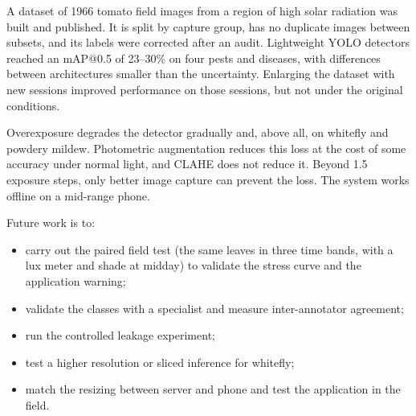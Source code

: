 \documentclass[sensors,article,submit,pdftex,moreauthors]{Definitions/mdpi}
\begin{document}
A dataset of 1966 tomato field images from a region of high solar radiation was built and published. It is split by capture group, has no duplicate images between subsets, and its labels were corrected after an audit. Lightweight YOLO detectors reached an mAP@0.5 of 23--30\% on four pests and diseases, with differences between architectures smaller than the uncertainty. Enlarging the dataset with new sessions improved performance on those sessions, but not under the original conditions.

Overexposure degrades the detector gradually and, above all, on whitefly and powdery mildew. Photometric augmentation reduces this loss at the cost of some accuracy under normal light, and CLAHE does not reduce it. Beyond 1.5 exposure steps, only better image capture can prevent the loss. The system works offline on a mid-range phone.

Future work is to:
\begin{itemize}[leftmargin=*,labelsep=4.9mm]
\item carry out the paired field test (the same leaves in three time bands, with a lux meter and shade at midday) to validate the stress curve and the application warning;
\item validate the classes with a specialist and measure inter-annotator agreement;
\item run the controlled leakage experiment;
\item test a higher resolution or sliced inference for whitefly;
\item match the resizing between server and phone and test the application in the field.
\end{itemize}

\vspace{6pt}




\end{document}
